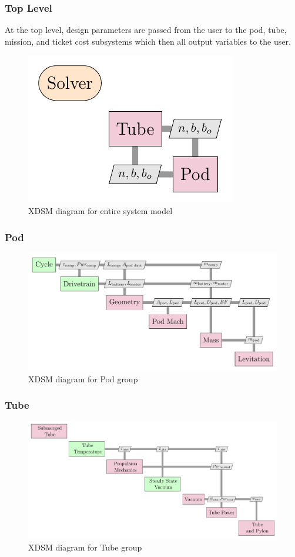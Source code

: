 \subsubsection{Top Level}
	At the top level, design parameters are passed from the user to the pod, tube, mission, and ticket cost subsystems which then all output variables to the user.
	\begin{figure}
		\centering
		\includegraphics{../images/xdsm/tube_and_pod.pdf}
		\caption{XDSM diagram for entire system model}
		\label{fig:xdsm:toplevel}
	\end{figure}
\subsubsection{Pod}
	\begin{figure}
		\centering
		\includegraphics{../images/xdsm/pod.pdf}
		\caption{XDSM diagram for Pod group}
		\label{fig:xdsm:pod}
	\end{figure}
\subsubsection{Tube}
	\begin{figure}
		\centering
		\includegraphics{../images/xdsm/tube.pdf}
		\caption{XDSM diagram for Tube group}
		\label{fig:xdsm:tube}
	\end{figure}

